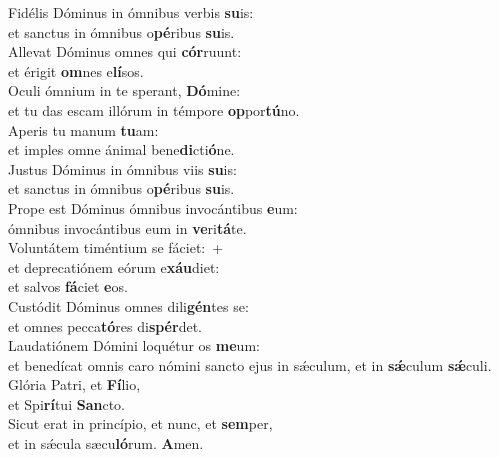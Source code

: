 \evenverse Fidélis Dóminus in ómnibus verbis \textbf{su}is:~\*\\
\evenverse et sanctus in ómnibus o\textbf{pé}ribus \textbf{su}is.\\
\oddverse Allevat Dóminus omnes qui \textbf{cór}ruunt:~\*\\
\oddverse et érigit \textbf{om}nes e\textbf{lí}sos.\\
\evenverse Oculi ómnium in te sperant, \textbf{Dó}mine:~\*\\
\evenverse et tu das escam illórum in témpore \textbf{op}por\textbf{tú}no.\\
\oddverse Aperis tu manum \textbf{tu}am:~\*\\
\oddverse et imples omne ánimal bene\textbf{di}cti\textbf{ó}ne.\\
\evenverse Justus Dóminus in ómnibus viis \textbf{su}is:~\*\\
\evenverse et sanctus in ómnibus o\textbf{pé}ribus \textbf{su}is.\\
\oddverse Prope est Dóminus ómnibus invocántibus \textbf{e}um:~\*\\
\oddverse ómnibus invocántibus eum in \textbf{ve}ri\textbf{tá}te.\\
\evenverse Voluntátem timéntium se fáciet:~+\\
\evenverse  et deprecatiónem eórum e\textbf{xáu}diet:~\*\\
\evenverse et salvos \textbf{fá}ciet \textbf{e}os.\\
\oddverse Custódit Dóminus omnes dili\textbf{gén}tes se:~\*\\
\oddverse et omnes pecca\textbf{tó}res di\textbf{spér}det.\\
\evenverse Laudatiónem Dómini loquétur os \textbf{me}um:~\*\\
\evenverse et benedícat omnis caro nómini sancto ejus in sǽculum, et in \textbf{sǽ}culum \textbf{sǽ}culi.\\
\oddverse Glória Patri, et \textbf{Fí}lio,~\*\\
\oddverse et Spi\textbf{rí}tui \textbf{San}cto.\\
\evenverse Sicut erat in princípio, et nunc, et \textbf{sem}per,~\*\\
\evenverse et in sǽcula sæcu\textbf{ló}rum. \textbf{A}men.\\
